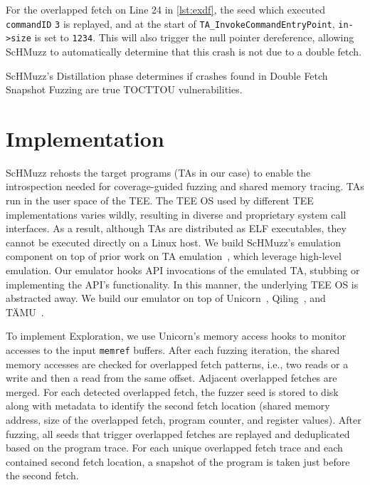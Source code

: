 \documentclass[letterpaper,twocolumn,10pt]{article}
\newcommand{\sysname}{ScHMuzz\xspace}
\newcommand{\stageone}{Exploration\xspace}
\newcommand{\stagetwo}{Double Fetch Snapshot Fuzzing\xspace}
\newcommand{\stagethree}{Distillation\xspace}
\begin{document}
For the overlapped fetch on Line 24 in \autoref{lst:exdf}, the seed which executed \texttt{commandID} \texttt{3} 
is replayed, and at the start of \texttt{TA\_InvokeCommandEntryPoint}, \texttt{in->size} is set to 
\texttt{1234}. This will also trigger the null pointer dereference, allowing \sysname to automatically 
determine that this crash is not due to a double fetch.

\begin{tcolorbox}
    \sysname's \stagethree phase determines if crashes found in \stagetwo are true 
    TOCTTOU vulnerabilities.
\end{tcolorbox} 

\section{Implementation}\label{sec:implementation}

\sysname rehosts the target programs (TAs in our case) to enable the introspection 
needed for coverage-guided fuzzing and shared memory tracing.
TAs run in the user space of the TEE. The TEE OS used by 
different TEE implementations varies wildly, resulting in diverse and proprietary system call 
interfaces. As a result, although TAs are distributed as ELF executables, they cannot 
be executed directly on a Linux host.
We build \sysname's emulation component on top of prior work on TA emulation~\cite{taemu,busch2020finding,fan2025qsee,qseecyberes,Thalium2023PivotingSecureWorld,Komaromy2021UnboxYourPhone,AdamskiGuilbonPeterlin2019SamsungTrustZone,Li2024DiveIntoAndroidTA}, 
which leverage high-level emulation. Our emulator hooks API invocations of the emulated TA, 
stubbing or implementing the API's functionality. In this manner, the underlying TEE OS is abstracted away.
We build our emulator on top of Unicorn~\cite{unicorn}, Qiling~\cite{qiling}, and TÄMU~\cite{taemu}.

To implement \stageone, we use Unicorn's memory access hooks to monitor accesses to the input \texttt{memref} buffers.
After each fuzzing iteration, the shared memory accesses are checked for overlapped fetch patterns, i.e., 
two reads or a write and then a read from the same offset. Adjacent overlapped fetches are merged. 
For each detected overlapped fetch, the fuzzer seed is stored 
to disk along with metadata to identify the second fetch location (shared memory address, size of the overlapped fetch, 
program counter, and register values). 
After fuzzing, all seeds that trigger overlapped fetches are replayed and deduplicated 
based on the program trace. For each unique overlapped fetch trace and each contained second fetch location, 
a snapshot of the program is taken just before the second fetch. 
\end{document}
